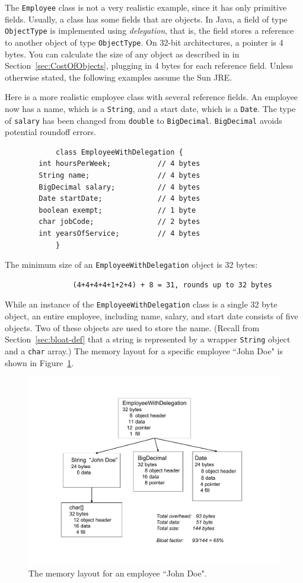 The \texttt{Employee} class is not a very realistic example, since it has only primitive fields. Usually, a class has some fields that are objects.  In Java, a field of type \texttt{ObjectType} is implemented using \textit{delegation}, that is, the field stores a reference to another object of type \texttt{ObjectType}. On 32-bit architectures, a pointer is 4 bytes. You can calculate the size of any object as described in in Section~\ref{sec:CostOfObjects}, plugging in 4 bytes for each reference field. Unless otherwise stated, the following examples assume the Sun JRE. 
\begin{example}
Here is a more realistic employee class with several reference fields. An employee now has a name, which is a \texttt{String}, and a start date, which is a \texttt{Date}. The type of \texttt{salary} has been changed from \texttt{double} to \texttt{BigDecimal}. \texttt{BigDecimal} avoids potential roundoff errors.
\ttfamily
\begin{verbatim} 
			class EmployeeWithDelegation {
        int hoursPerWeek;           // 4 bytes
        String name;                // 4 bytes
        BigDecimal salary;          // 4 bytes
        Date startDate;             // 4 bytes
        boolean exempt;             // 1 byte
        char jobCode;               // 2 bytes
        int yearsOfService;         // 4 bytes
			}
\end{verbatim}
\normalfont
The minimum size of an \texttt{EmployeeWithDelegation} object is 32 bytes:
\begin{verbatim}
                (4+4+4+4+1+2+4) + 8 = 31, rounds up to 32 bytes
\end{verbatim} 
\end{example}

While an instance of the \texttt{EmployeeWithDelegation} class is a single 32 byte object, an entire employee, including name, salary, and start date consists of five objects. Two of these objects are used to store the name. (Recall from Section~\ref{sec:bloat-def} that a string is represented by a wrapper \texttt{String} object and a \texttt{char} array.) The memory layout for a specific employee ``John Doe" is shown in Figure~\ref{fig:employee-status}. 
 \begin{figure}
  \centering
 \includegraphics[width=.60\textwidth]{Figures/chapter4/employee-status.pdf}
  \caption{The memory layout for an employee ``John Doe".}
  \label{fig:employee-status}
\end{figure}

